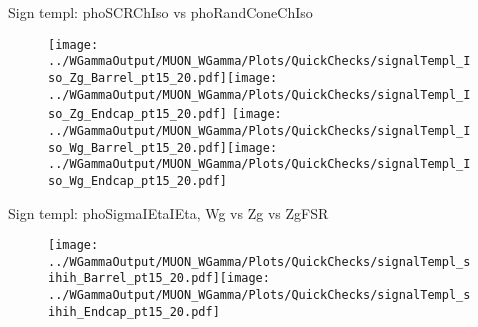 \documentclass{beamer}
\begin{document}
\begin{frame}{Sign templ: phoSCRChIso vs phoRandConeChIso}
  \begin{figure}
    \centering
    \texttt{[image: ../WGammaOutput/MUON\_WGamma/Plots/QuickChecks/signalTempl\_Iso\_Zg\_Barrel\_pt15\_20.pdf]}\texttt{[image: ../WGammaOutput/MUON\_WGamma/Plots/QuickChecks/signalTempl\_Iso\_Zg\_Endcap\_pt15\_20.pdf]}
    \texttt{[image: ../WGammaOutput/MUON\_WGamma/Plots/QuickChecks/signalTempl\_Iso\_Wg\_Barrel\_pt15\_20.pdf]}\texttt{[image: ../WGammaOutput/MUON\_WGamma/Plots/QuickChecks/signalTempl\_Iso\_Wg\_Endcap\_pt15\_20.pdf]}
  \end{figure}
\end{frame}

\begin{frame}{Sign templ: phoSigmaIEtaIEta, Wg vs Zg vs ZgFSR}
  \begin{figure}
    \centering
    \texttt{[image: ../WGammaOutput/MUON\_WGamma/Plots/QuickChecks/signalTempl\_sihih\_Barrel\_pt15\_20.pdf]}\texttt{[image: ../WGammaOutput/MUON\_WGamma/Plots/QuickChecks/signalTempl\_sihih\_Endcap\_pt15\_20.pdf]}
  \end{figure}
\end{frame}

\end{document}
